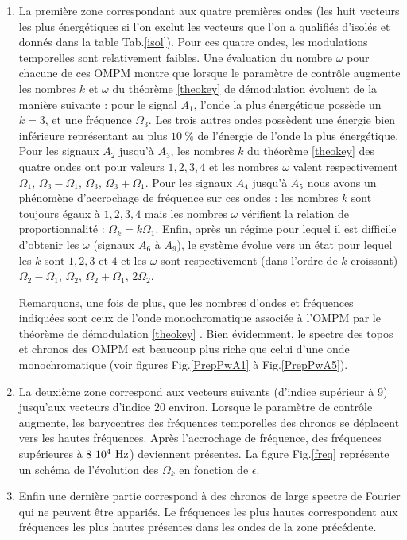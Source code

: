 \documentclass{book}
\begin{document}
\begin{enumerate}
\item La premi\`ere zone correspondant aux quatre premi\`eres ondes
(les huit 
vecteurs les plus \'energ\'etiques si l'on exclut les vecteurs que
l'on a qualifi\'es d'isol\'es et donn\'es dans la table Tab.\ref{isol}).
Pour ces quatre ondes, les modulations temporelles sont relativement
faibles. Une \'evaluation du nombre $\omega$ pour chacune de ces OMPM
montre que 
lorsque le param\`etre de contr\^ole augmente les nombres $k$ et $\omega$
du th\'eor\`eme \ref{theokey} de d\'emodulation
 \'evoluent de la mani\`ere
suivante : 
pour le signal $A_1$, l'onde la plus \'energ\'etique poss\`ede un
$k=3$, et une fr\'equence
$\Omega_3$. Les trois autres ondes poss\`edent une \'energie bien
inf\'erieure repr\'esentant au plus $10\ \%$ de l'\'energie de l'onde
la plus \'energ\'etique.
Pour les signaux $A_2$ jusqu'\`a $A_3$, les nombres $k$ du
th\'eor\`eme \ref{theokey} des quatre 
ondes 
ont pour valeurs $1,2,3,4$ et les nombres $\omega$ valent
respectivement  $\Omega_1$,
$\Omega_3-\Omega_1$, $\Omega_3$, $\Omega_3+\Omega_1$.
Pour les signaux $A_4$ jusqu'\`a $A_5$ nous avons un ph\'enom\`ene
d'accrochage de fr\'equence sur ces ondes : les nombres $k$ sont
toujours \'egaux 
\`a $1,2,3,4$ mais les nombres $\omega$ v\'erifient la relation de
proportionnalit\'e : 
$\Omega_k=k\Omega_1$.
Enfin, apr\`es un r\'egime pour lequel il est difficile d'obtenir les
$\omega$ (signaux $A_6$ \`a $A_9$), le syst\`eme \'evolue vers un \'etat pour
lequel les $k$ sont $1,2,3$ et $4$ et les $\omega$ sont respectivement
(dans l'ordre de $k$ croissant) $\Omega_2-\Omega_1$, $\Omega_2$,
$\Omega_2+\Omega_1$, $2\Omega_2$. 

Remarquons, une fois de plus, que
les nombres d'ondes 
et fr\'equences indiqu\'ees sont ceux de l'onde monochromatique
associ\'ee \`a l'OMPM par le th\'eor\`eme de d\'emodulation
\ref{theokey} . Bien 
\'evidemment, le spectre des topos et chronos des OMPM est
beaucoup plus riche que celui d'une onde monochromatique (voir figures
Fig.\ref{PrepPwA1} \`a Fig.\ref{PrepPwA5}).
 
\item La deuxi\`eme zone correspond 
aux vecteurs suivants (d'indice sup\'erieur \`a 9) jusqu'aux vecteurs
d'indice $20$ environ.
Lorsque le param\`etre de contr\^ole augmente, les barycentres des
fr\'equences 
temporelles des chronos se d\'eplacent vers les hautes fr\'equences.
Apr\`es 
l'accrochage de fr\'equence, des fr\'equences sup\'erieures \`a $8\
10^4\ {\rm Hz}$) deviennent pr\'esentes. La figure 
Fig.\ref{freq} 
repr\'esente un sch\'ema de l'\'evolution des $\Omega_k$ en fonction
de $\epsilon$. 

\item Enfin une derni\`ere partie correspond \`a des chronos de large
spectre de Fourier qui ne peuvent \^etre appari\'es. Le fr\'equences les
plus hautes correspondent aux fr\'equences les plus hautes pr\'esentes
dans les ondes de la zone pr\'ec\'edente.
\end{enumerate}
\end{document}
